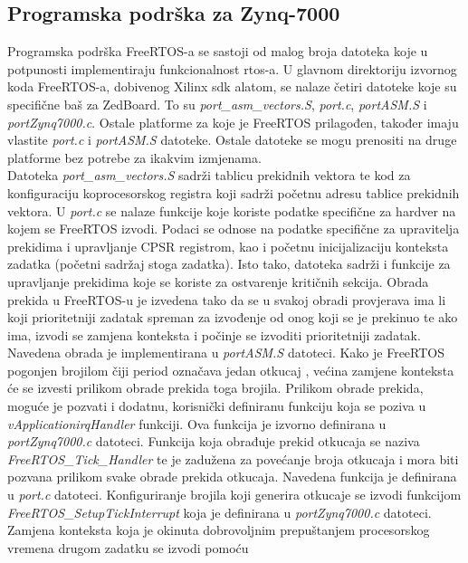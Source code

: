 \documentclass[times, utf8, diplomski, numeric]{fer}
\begin{document}
\subsection{Programska podrška za Zynq-7000}
Programska podrška FreeRTOS-a se sastoji od malog broja datoteka koje u potpunosti implementiraju funkcionalnost \gls{rtos}-a.
U glavnom direktoriju izvornog koda FreeRTOS-a, dobivenog Xilinx \gls{sdk} alatom, se nalaze četiri datoteke koje su specifične
baš za ZedBoard. To su \textit{port\_asm\_vectors.S}, \textit{port.c}, \textit{portASM.S} i \textit{portZynq7000.c}. Ostale
platforme za koje je FreeRTOS prilagođen, također imaju vlastite \textit{port.c} i \textit{portASM.S} datoteke. Ostale
datoteke se mogu prenositi na druge platforme bez potrebe za ikakvim izmjenama.\\
Datoteka \textit{port\_asm\_vectors.S} sadrži tablicu prekidnih vektora te kod za konfiguraciju koprocesorskog registra koji
sadrži početnu adresu tablice prekidnih vektora. U \textit{port.c} se nalaze funkcije koje koriste podatke specifične za
hardver na kojem se FreeRTOS izvodi. Podaci se odnose na podatke specifične za upravitelja prekidima i upravljanje CPSR
registrom, kao i početnu inicijalizaciju konteksta zadatka (početni sadržaj stoga zadatka). Isto tako, datoteka sadrži i
funkcije za upravljanje prekidima koje se koriste za ostvarenje kritičnih sekcija. Obrada prekida u FreeRTOS-u je izvedena
tako da se u svakoj obradi provjerava ima li koji prioritetniji zadatak spreman za izvođenje od onog koji se je prekinuo te
ako ima, izvodi se zamjena konteksta i počinje se izvoditi prioritetniji zadatak. Navedena obrada je implementirana u
\textit{portASM.S} datoteci. Kako je FreeRTOS pogonjen brojilom čiji period označava jedan otkucaj , većina
zamjene konteksta će se izvesti prilikom obrade prekida toga brojila. Prilikom obrade prekida, moguće je pozvati i dodatnu,
korisnički definiranu funkciju koja se poziva u \textit{vApplication\gls{irq}Handler} funkciji. Ova funkcija je izvorno definirana
u \textit{portZynq7000.c} datoteci. Funkcija koja obrađuje prekid otkucaja se naziva \textit{FreeRTOS\_Tick\_Handler} te
je zadužena za povećanje broja otkucaja i mora biti pozvana prilikom svake obrade prekida otkucaja. Navedena funkcija je
definirana u \textit{port.c} datoteci. Konfiguriranje brojila koji generira otkucaje se izvodi funkcijom
\textit{FreeRTOS\_SetupTickInterrupt} koja je definirana u \textit{portZynq7000.c} datoteci.\\
Zamjena konteksta koja je okinuta dobrovoljnim prepuštanjem procesorskog vremena drugom zadatku se izvodi pomoću
\end{document}

